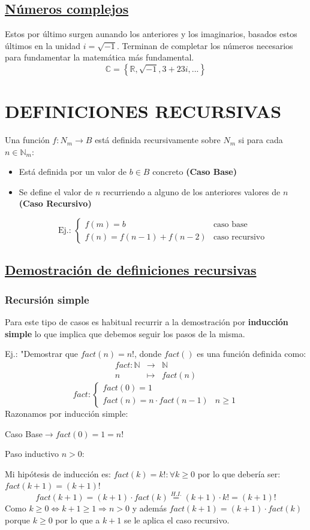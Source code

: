 \documentclass[10pt,a4paper,openright]{book}
\begin{document}
\subsection*{\underline{Números complejos}}
Estos por último surgen aunando los anteriores y los imaginarios, basados estos últimos en la unidad $i=\sqrt{-1}$. Terminan de completar los números necesarios para fundamentar la matemática más fundamental.
$$\mathbb C=\left\lbrace \mathbb R,\sqrt{-1}, 3+23i, ...\right\rbrace$$

\section*{DEFINICIONES RECURSIVAS}
Una función $f: N_m\rightarrow B$ está definida recursivamente sobre $N_m$ si para cada $n \in \mathbb N_m$:
\begin{itemize}
\item Está definida por un valor de $b\in B$ concreto \textbf{(Caso Base)}
\item Se define el valor de $n$ recurriendo a alguno de los anteriores valores de $n$ \textbf{(Caso Recursivo)}\par
$$\mbox{Ej.: }\begin{cases}
f(m)=b & \mbox{caso base} \\
f(n)=f(n-1)+f(n-2) & \mbox{caso recursivo}
\end{cases}$$ 
\end{itemize}

\subsection*{\underline{Demostración de definiciones recursivas}}
\subsubsection*{Recursión simple}
Para este tipo de casos es habitual recurrir a la demostración por \textbf{inducción simple} lo que implica que debemos seguir los pasos de la misma.\par
Ej.: "Demostrar que $fact(n)=n!$, donde $fact()$ es una función definida como:
\begin{eqnarray*}
fact: \mathbb N & \rightarrow & \mathbb N \\
n & \longmapsto & fact(n) 
\end{eqnarray*}
$$fact:\begin{cases}
fact(0)=1 \\
fact(n)=n\cdot fact(n-1) & n\geq 1
\end{cases}$$
Razonamos por inducción simple:\par
Caso Base$\rightarrow fact(0)=1=n!$\par
Paso inductivo $n>0$:\par
Mi hipótesis de inducción es: $fact(k)=k!: \forall k \geq 0$ por lo que debería ser: $fact(k+1)=(k+1)!$
$$fact(k+1)=(k+1)\cdot fact(k)\stackrel{H.I.}{=}(k+1)\cdot k!=(k+1)!$$
Como $k\geq 0\Leftrightarrow k+1\geq 1\Rightarrow n>0$ y además $fact(k+1)=(k+1)\cdot fact(k)$ porque $k\geq 0$ por lo que a $k+1$ se le aplica el caso recursivo.
\end{document}
